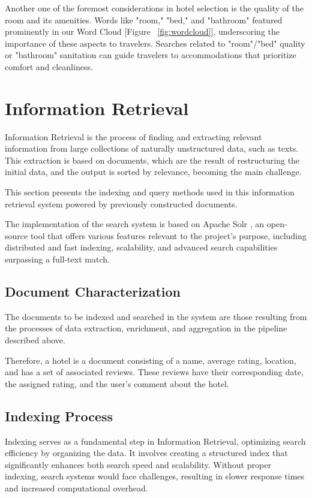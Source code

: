 \documentclass[sigconf]{acmart}
\begin{document}
Another one of the foremost considerations in hotel selection is the quality of the room and its amenities. Words like "room," "bed," and "bathroom" featured prominently in our Word Cloud [Figure ~\ref{fig:wordcloud}], underscoring the importance of these aspects to travelers. Searches related to "room"/"bed" quality or "bathroom" sanitation can guide travelers to accommodations that prioritize comfort and cleanliness.

\section{ Information Retrieval}

Information Retrieval \cite{Information_Retrieval} is the process of finding and extracting relevant information from large collections of naturally unstructured data, such as texts. This extraction is based on documents, which are the result of restructuring the initial data, and the output is sorted by relevance, becoming the main challenge.

This section presents the indexing and query methods used in this information retrieval system powered by previously constructed documents. 

The implementation of the search system is based on Apache Solr \cite{Apache_Solr} , an open-source tool that offers various features relevant to the project's purpose, including distributed and fast indexing, scalability, and advanced search capabilities surpassing a full-text match.

\subsection{Document Characterization}

The documents to be indexed and searched in the system are those resulting from the processes of data extraction, enrichment, and aggregation in the pipeline described above.

Therefore, a hotel is a document consisting of a name, average rating, location, and has a set of associated reviews. These reviews have their corresponding date, the assigned rating, and the user's comment about the hotel.

\subsection{ Indexing Process}

Indexing serves as a fundamental step in Information Retrieval, optimizing search efficiency by organizing the data. It involves creating a structured index that significantly enhances both search speed and scalability. Without proper indexing, search systems would face challenges, resulting in slower response times and increased computational overhead.
\end{document}
